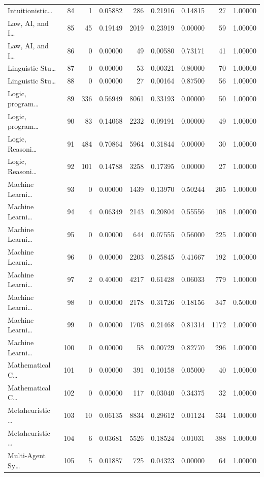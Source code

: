 \begin{table}
\begin{tabular}{lrrrrrrrr}
Intuitionistic… & 84 & 1 & 0.05882 & 286 & 0.21916 & 0.14815 & 27 & 1.00000 \\
Law, AI, and I… & 85 & 45 & 0.19149 & 2019 & 0.23919 & 0.00000 & 59 & 1.00000 \\
Law, AI, and I… & 86 & 0 & 0.00000 & 49 & 0.00580 & 0.73171 & 41 & 1.00000 \\
Linguistic Stu… & 87 & 0 & 0.00000 & 53 & 0.00321 & 0.80000 & 70 & 1.00000 \\
Linguistic Stu… & 88 & 0 & 0.00000 & 27 & 0.00164 & 0.87500 & 56 & 1.00000 \\
Logic, program… & 89 & 336 & 0.56949 & 8061 & 0.33193 & 0.00000 & 50 & 1.00000 \\
Logic, program… & 90 & 83 & 0.14068 & 2232 & 0.09191 & 0.00000 & 49 & 1.00000 \\
Logic, Reasoni… & 91 & 484 & 0.70864 & 5964 & 0.31844 & 0.00000 & 30 & 1.00000 \\
Logic, Reasoni… & 92 & 101 & 0.14788 & 3258 & 0.17395 & 0.00000 & 27 & 1.00000 \\
Machine Learni… & 93 & 0 & 0.00000 & 1439 & 0.13970 & 0.50244 & 205 & 1.00000 \\
Machine Learni… & 94 & 4 & 0.06349 & 2143 & 0.20804 & 0.55556 & 108 & 1.00000 \\
Machine Learni… & 95 & 0 & 0.00000 & 644 & 0.07555 & 0.56000 & 225 & 1.00000 \\
Machine Learni… & 96 & 0 & 0.00000 & 2203 & 0.25845 & 0.41667 & 192 & 1.00000 \\
Machine Learni… & 97 & 2 & 0.40000 & 4217 & 0.61428 & 0.06033 & 779 & 1.00000 \\
Machine Learni… & 98 & 0 & 0.00000 & 2178 & 0.31726 & 0.18156 & 347 & 0.50000 \\
Machine Learni… & 99 & 0 & 0.00000 & 1708 & 0.21468 & 0.81314 & 1172 & 1.00000 \\
Machine Learni… & 100 & 0 & 0.00000 & 58 & 0.00729 & 0.82770 & 296 & 1.00000 \\
Mathematical C… & 101 & 0 & 0.00000 & 391 & 0.10158 & 0.05000 & 40 & 1.00000 \\
Mathematical C… & 102 & 0 & 0.00000 & 117 & 0.03040 & 0.34375 & 32 & 1.00000 \\
Metaheuristic … & 103 & 10 & 0.06135 & 8834 & 0.29612 & 0.01124 & 534 & 1.00000 \\
Metaheuristic … & 104 & 6 & 0.03681 & 5526 & 0.18524 & 0.01031 & 388 & 1.00000 \\
Multi-Agent Sy… & 105 & 5 & 0.01887 & 725 & 0.04323 & 0.00000 & 64 & 1.00000 \\

\end{tabular}
\end{table}
